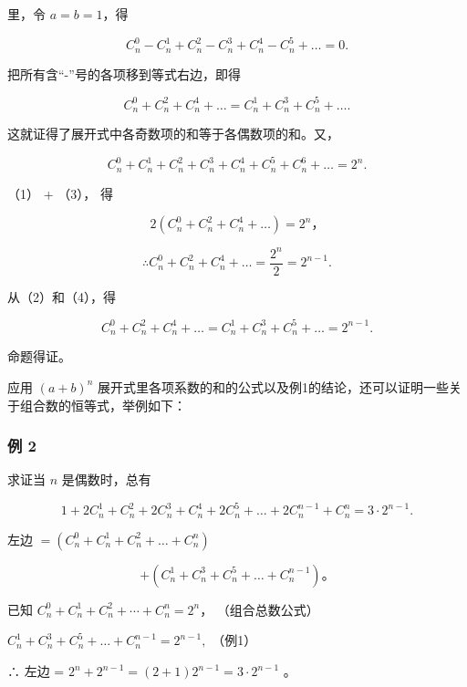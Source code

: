 里，令 \(a = b = 1\)，得

\[
C _ {n} ^ {0} - C _ {n} ^ {1} + C _ {n} ^ {2} - C _ {n} ^ {3} + C _ {n} ^ {4} - C _ {n} ^ {5} + \dots = 0. \tag {1}
\]

把所有含``-''号的各项移到等式右边，即得

\[
C _ {n} ^ {0} + C _ {n} ^ {2} + C _ {n} ^ {4} + \dots = C _ {n} ^ {1} + C _ {n} ^ {3} + C _ {n} ^ {5} + \dots . \tag {2}
\]

这就证得了展开式中各奇数项的和等于各偶数项的和。又，

\[
C _ {n} ^ {0} + C _ {n} ^ {1} + C _ {n} ^ {2} + C _ {n} ^ {3} + C _ {n} ^ {4} + C _ {n} ^ {5} + C _ {n} ^ {6} + \dots = 2 ^ {n}. \tag {3}
\]

（1） + （3）， 得

\[
2 (C _ {n} ^ {0} + C _ {n} ^ {2} + C _ {n} ^ {4} + \dots) = 2 ^ {n}\text{，}
\]

\[
\therefore C _ {n} ^ {0} + C _ {n} ^ {2} + C _ {n} ^ {4} + \dots = \frac {2 ^ {n}}{2} = 2 ^ {n - 1}. \tag {4}
\]

从（2）和（4），得

\[
C _ {n} ^ {0} + C _ {n} ^ {2} + C _ {n} ^ {4} + \dots = C _ {n} ^ {1} + C _ {n} ^ {3} + C _ {n} ^ {5} + \dots = 2 ^ {n - 1}.
\]

命题得证。

应用 \((a + b)^n\)
展开式里各项系数的和的公式以及例1的结论，还可以证明一些关于组合数的恒等式，举例如下：

\subsubsection{例 2}

求证当 \(n\) 是偶数时，总有

\[
1 + 2 C _ {n} ^ {1} + C _ {n} ^ {2} + 2 C _ {n} ^ {3} + C _ {n} ^ {4} + 2 C _ {n} ^ {5} + \dots + 2 C _ {n} ^ {n - 1} + C _ {n} ^ {n} = 3 \cdot 2 ^ {n - 1}.
\]

 左边
\(= (C_{n}^{0} + C_{n}^{1} + C_{n}^{2} + \dots + C_{n}^{n})\)

\[
+ \left(C _ {n} ^ {1} + C _ {n} ^ {3} + C _ {n} ^ {5} + \dots + C _ {n} ^ {n - 1}\right)\text{。}
\]

已知 \(C_n^0+C_n^1+C_n^2+\cdots+C_n^n=2^n\)， （组合总数公式）

\(C_{n}^{1} + C_{n}^{3} + C_{n}^{5} + \dots +C_{n}^{n - 1} = 2^{n - 1},\)
（例1）

∴ 左边 = \(2^{n} + 2^{n-1} = (2 + 1)2^{n-1} = 3 \cdot 2^{n-1}\) 。

